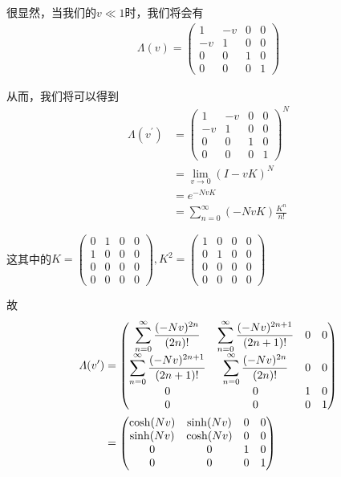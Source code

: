 \documentclass{article}
\begin{document}
很显然，当我们的$v\ll 1$时，我们将会有
\begin{align*}
    \varLambda(v)=
    \begin{pmatrix}
        1&-v&0&0\\
        -v&1&0&0\\
        0&0&1&0\\
        0&0&0&1   
    \end{pmatrix}
\end{align*}

从而，我们将可以得到
\begin{align*}
    \varLambda(v^\prime)&=
    \begin{pmatrix}
        1&-v&0&0\\
        -v&1&0&0\\
        0&0&1&0\\
        0&0&0&1   
    \end{pmatrix}^N\\
    &=\lim_{v\to0}(I-vK)^N\\
    &=e^{-NvK}\\
    &=\sum_{n=0}^{\infty}(-NvK)\frac{K^n}{n!}
\end{align*}

这其中的$K=\begin{pmatrix}
    0&1&0&0\\
    1&0&0&0\\
    0&0&0&0\\
    0&0&0&0
\end{pmatrix},K^2=\begin{pmatrix}
    1&0&0&0\\
    0&1&0&0\\
    0&0&0&0\\
    0&0&0&0
\end{pmatrix}$

故
\begin{align*}
    \varLambda(v^\prime)&=
    \begin{pmatrix}
        \displaystyle\sum_{n=0}^{\infty}\frac{(-Nv)^{2n}}{(2n)!}&\displaystyle\sum_{n=0}^{\infty}\frac{(-Nv)^{2n+1}}{(2n+1)!}&0&0\\
        \displaystyle\sum_{n=0}^{\infty}\frac{(-Nv)^{2n+1}}{(2n+1)!}&\displaystyle\sum_{n=0}^{\infty}\frac{(-Nv)^{2n}}{(2n)!}&0&0\\
        0&0&1&0\\
        0&0&0&1   
    \end{pmatrix}\\
    &=\begin{pmatrix}
        \cosh(\-Nv)&\sinh(\-Nv)&0&0\\
        \sinh(\-Nv)&\cosh(\-Nv)&0&0\\
        0&0&1&0\\
        0&0&0&1   
    \end{pmatrix}
\end{align*}
\end{document}
